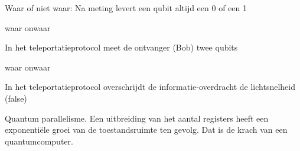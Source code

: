 \documentclass[a4paper, addpoints, 12pt
    , noanswers    %
    ]{exam}
\begin{document}
\begin{questions}
\question [1]
Waar of niet waar: Na meting levert een qubit altijd een 0 of een 1
\begin{oneparchoices}
\correctchoice waar
\choice onwaar
\end{oneparchoices}


\question[1]
In het teleportatieprotocol meet de ontvanger (Bob) twee qubits
\begin{oneparchoices}
\choice waar
\correctchoice onwaar
\end{oneparchoices}

In het teleportatieprotocol overschrijdt de  informatie-overdracht de lichtsnelheid (false)

\question[1]
Quantum parallelisme. Een uitbreiding van het aantal registers heeft een exponenti\"ele groei van de toestandsruimte ten gevolg. Dat is de krach van een quantumcomputer.
\end{questions}
\end{document}
